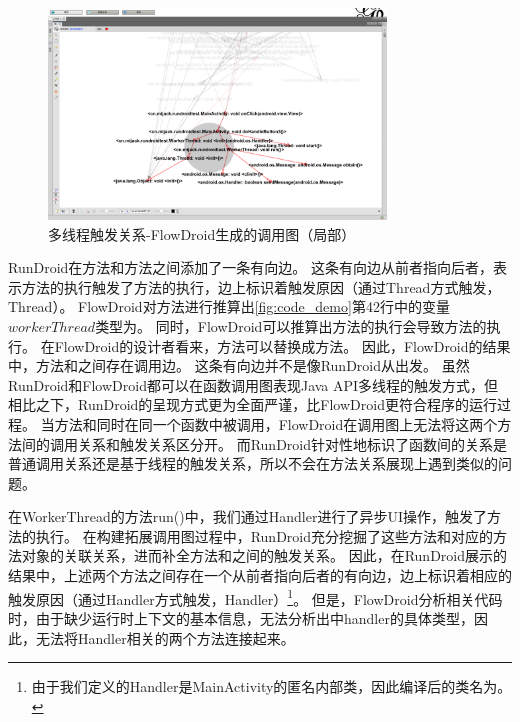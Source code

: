 \begin{figure}[ht]
	\centering
	\includegraphics[width=0.8\textwidth]{./Figures/FlowDroid-handler.png}
	\caption{多线程触发关系-FlowDroid生成的调用图（局部）}
	\label{fig:flowdroid-result-handler}
\end{figure}



RunDroid在方法和方法之间添加了一条有向边。
这条有向边从前者指向后者，表示方法的执行触发了方法的执行，边上标识着触发原因（通过Thread方式触发，Thread）。
FlowDroid对方法进行推算出\autoref{fig:code_demo}第42行中的变量$workerThread$类型为。
同时，FlowDroid可以推算出方法的执行会导致方法的执行。
在FlowDroid的设计者看来，方法可以替换成方法。
因此，FlowDroid的结果中，方法和之间存在调用边。
这条有向边并不是像RunDroid从出发。
虽然RunDroid和FlowDroid都可以在函数调用图表现Java API多线程的触发方式，但相比之下，RunDroid的呈现方式更为全面严谨，比FlowDroid更符合程序的运行过程。
当方法和同时在同一个函数中被调用，FlowDroid在调用图上无法将这两个方法间的调用关系和触发关系区分开。
而RunDroid针对性地标识了函数间的关系是普通调用关系还是基于线程的触发关系，所以不会在方法关系展现上遇到类似的问题。



在WorkerThread的方法run()中，我们通过Handler进行了异步UI操作，触发了方法的执行。
在构建拓展调用图过程中，RunDroid充分挖掘了这些方法和对应的方法对象的关联关系，进而补全方法和之间的触发关系。
因此，在RunDroid展示的结果中，上述两个方法之间存在一个从前者指向后者的有向边，边上标识着相应的触发原因（通过Handler方式触发，Handler）\footnote{由于我们定义的Handler是MainActivity的匿名内部类，因此编译后的类名为。}。
但是，FlowDroid分析相关代码时，由于缺少运行时上下文的基本信息，无法分析出中handler的具体类型，因此，无法将Handler相关的两个方法连接起来。




